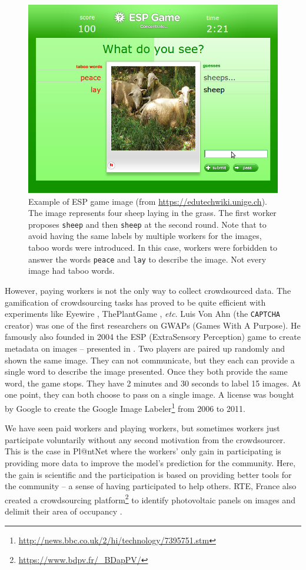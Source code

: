 \begin{figure}[ht]
        \centering
        \includegraphics[width=.6\textwidth]{chapters/images/ESP.png}
        \caption{Example of ESP game image (from \url{https://edutechwiki.unige.ch}). The image represents four sheep laying in the grass. The first worker proposes \texttt{sheep} and then \texttt{sheep} at the second round. Note that to avoid having the same labels by multiple workers for the images, taboo words were introduced. In this case, workers were forbidden to answer the words \texttt{peace} and \texttt{lay} to describe the image. Not every image had taboo words.}
        \label{fig:ESP-game}
\end{figure}

However, paying workers is not the only way to collect crowdsourced data.
The gamification of crowdsourcing tasks has proved to be quite efficient with experiments like Eyewire \citep{tinati2017investigation}, ThePlantGame \citep{plantgame2016}, \emph{etc}.
Luis Von Ahn (the \texttt{CAPTCHA} creator) was one of the first researchers on GWAPs (Games With A Purpose).
He famously also founded in 2004 the ESP (ExtraSensory Perception) game \citep{von2005esp} to create metadata on images --  presented in .
Two players are paired up randomly and shown the same image.
They can not communicate, but they each can provide a single word to describe the image presented.
Once they both provide the same word, the game stops.
They have 2 minutes and 30 seconds to label 15 images.
At one point, they can both choose to pass on a single image.
A license was bought by Google to create the Google Image Labeler\footnote{\url{http://news.bbc.co.uk/2/hi/technology/7395751.stm}} from 2006 to 2011.

We have seen paid workers and playing workers, but sometimes workers just participate voluntarily without any second motivation from the crowdsourcer.
This is the case in Pl@ntNet where the workers' only gain in participating is providing more data to improve the model's prediction for the community. Here, the gain is scientific and the participation is based on providing better tools for the community -- a sense of having participated to help others.
RTE, France also created a crowdsourcing platform\footnote{\url{https://www.bdpv.fr/_BDapPV/}} to identify photovoltaic panels on images and delimit their area of occupancy \citep{kasmi2023crowdsourced}.

